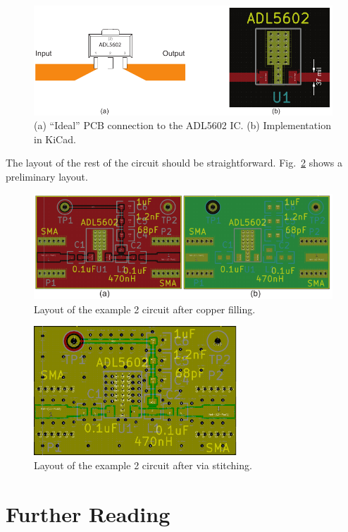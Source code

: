\documentclass[12pt,letterpaper]{scrartcl}
\begin{document}
\begin{figure}[ph]
	\centering
	\includegraphics{adl5602-connection}
	\caption{(a) ``Ideal'' PCB connection to the ADL5602 IC. (b) Implementation in KiCad.}
	\label{fig:adl5602-connection}
\end{figure}


The layout of the rest of the circuit should be straightforward. Fig.~\ref{fig:example2-layout-fill} shows a preliminary layout.

\begin{figure}[ph]
	\centering
	\includegraphics[width=5in]{example2-layout-fill}
	\caption{Layout of the example 2 circuit after copper filling.}
	\label{fig:example2-layout-fill}
\end{figure}

\begin{figure}[ph]
	\centering
	\includegraphics[width=3in]{example2-layout-via}
	\caption{Layout of the example 2 circuit after via stitching.}
	\label{fig:example2-layout-via}
\end{figure}

\newpage
\section{Further Reading}
\end{document}
